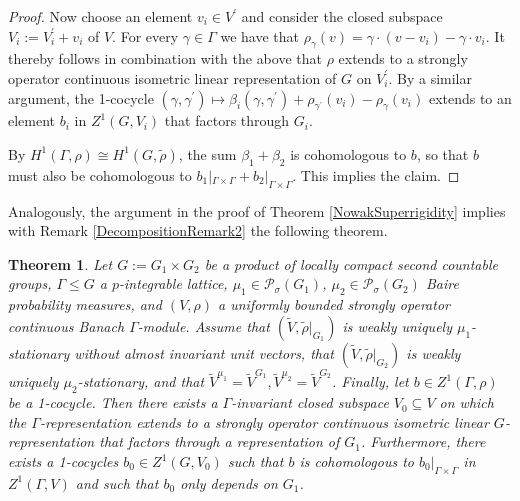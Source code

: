 \documentclass[a4paper,11pt,reqno]{amsart}
\numberwithin{equation}{section}
\newtheorem{theorem}{Theorem}[section]
\theoremstyle{definition}
\theoremstyle{remark}
\theoremstyle{remark}
\begin{document}
\begin{proof}
Now choose an element $v_{i}\in V^{\prime}$ and consider the closed subspace $V_{i}:=V_{i}^{\prime}+v_{i}$ of $V$. For every $\gamma\in\Gamma$ we have that $\rho_{\gamma}(v)=\gamma\cdot(v-v_{i})-\gamma\cdot v_{i}$. It thereby follows in combination with the above that $\rho$ extends to a strongly operator continuous isometric linear representation of $G$ on $V_{i}^{\prime}$. By a similar argument, the 1-cocycle $(\gamma,\gamma^{\prime})\mapsto\beta_{i}(\gamma,\gamma^{\prime})+\rho_{\gamma^{\prime}}(v_{i})-\rho_{\gamma}(v_{i})$ extends to an element $b_{i}$ in $Z^{1}(G,V_{i})$ that factors through $G_{i}$.

By $H^{1}(\Gamma,\rho)\cong H^{1}(G,\widetilde{\rho})$, the sum $\beta_{1}+\beta_{2}$ is cohomologous to $b$, so that $b$ must also be cohomologous to $b_{1}|_{\Gamma \times \Gamma}+b_{2}|_{\Gamma \times \Gamma}$. This implies the claim. \end{proof}

Analogously, the argument in the proof of Theorem \ref{NowakSuperrigidity} implies with Remark \ref{DecompositionRemark2} the following theorem.

\begin{theorem} \label{WeaklyProductSuperrigidity} Let $G:=G_{1}\times G_{2}$ be a product of locally compact second countable groups, $\Gamma\leq G$ a $p$-integrable lattice, $\mu_{1}\in\mathcal{P}_{\sigma}(G_{1})$, $\mu_{2}\in\mathcal{P}_{\sigma}(G_{2})$ Baire probability measures, and $(V,\rho)$ a uniformly bounded strongly operator continuous Banach $\Gamma$-module. Assume that $(\widetilde{V},\widetilde{\rho}|_{G_{1}})$ is weakly uniquely $\mu_{1}$-stationary without almost invariant unit vectors, that $(\widetilde{V},\widetilde{\rho}|_{G_{2}})$ is weakly uniquely $\mu_{2}$-stationary, and that $\widetilde{V}^{\mu_{1}}=\widetilde{V}^{G_{1}},\widetilde{V}^{\mu_{2}}=\widetilde{V}^{G_{2}}$. Finally, let $b\in Z^{1}(\Gamma,\rho)$ be a 1-cocycle. Then there exists a $\Gamma$-invariant closed subspace $V_{0}\subseteq V$ on which the $\Gamma$-representation extends to a strongly operator continuous isometric linear $G$-representation that factors through a representation of $G_{1}$. Furthermore, there exists a 1-cocycles $b_{0}\in Z^{1}(G,V_{0})$ such that $b$ is cohomologous to $b_{0}|_{\Gamma \times \Gamma}$ in $Z^{1}(\Gamma,V)$ and such that $b_{0}$ only depends on $G_{1}$. \end{theorem}
\end{document}
